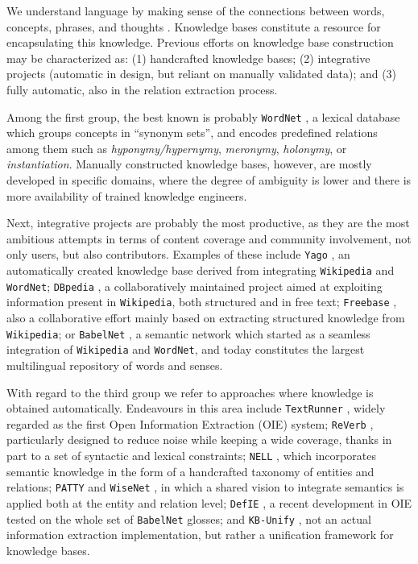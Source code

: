 We understand language by making sense of the connections between words, concepts, phrases, and thoughts \citep{Havasietal2007}. Knowledge bases constitute a resource for encapsulating this knowledge. Previous efforts on knowledge base construction may be characterized as: (1) handcrafted knowledge bases; (2) integrative projects (automatic in design, but reliant on manually validated data); and (3) fully automatic, also in the relation extraction process.

Among the first group, the best known is probably \texttt{WordNet} \citep{Miller1995}, a lexical database which groups concepts in ``synonym sets'', and encodes predefined relations among them such as \textit{hyponymy/hypernymy}, \textit{meronymy}, \textit{holonymy}, or \textit{instantiation}. Manually constructed knowledge bases, however, are mostly developed in specific domains, where the degree of ambiguity is lower and there is more availability of trained knowledge engineers.

Next, integrative projects are probably the most productive, as they are the most ambitious attempts in terms of content coverage and community involvement, not only users, but also contributors. Examples of these include \texttt{Yago} \citep{Suchaneketal2007}, an automatically created knowledge base derived from integrating \texttt{Wikipedia} and \texttt{WordNet}; \texttt{DBpedia} \citep{Lehmanetal2014}, a collaboratively maintained project aimed at exploiting information present in \texttt{Wikipedia}, both structured and in free text; \texttt{Freebase} \citep{Bollacketal2008}, also a collaborative effort mainly based on extracting structured knowledge from \texttt{Wikipedia}; or \texttt{BabelNet} \citep{NavigliPonzetto2012}, a semantic network which started as a seamless integration of \texttt{Wikipedia} and \texttt{WordNet}, and today constitutes the largest multilingual repository of words and senses.

With regard to the third group we refer to approaches where knowledge is obtained automatically. 
Endeavours in this area include \texttt{TextRunner} \citep{Bankoetal2007}, widely regarded as the first Open Information Extraction (OIE) system; \texttt{ReVerb} \citep{Fader2011}, particularly designed to reduce noise while keeping a wide coverage, thanks in part to a set of syntactic and lexical constraints; \texttt{NELL} \citep{Carlson2010}, which incorporates semantic knowledge in the form of a handcrafted taxonomy of entities and relations; \texttt{PATTY} \citep{Nakasholeetal2012} and \texttt{WiseNet} \citep{MoroandNavigli2012,MoroandNavigli2013}, in which a shared vision to integrate semantics is applied both at the entity and relation level; \texttt{DefIE} \citep{DelliBovietal2015b}, a recent development in OIE tested on the whole set of \texttt{BabelNet} glosses; and \texttt{KB-Unify} \citep{DelliBovietal2015}, not an actual information extraction implementation, but rather a unification framework for knowledge bases.

